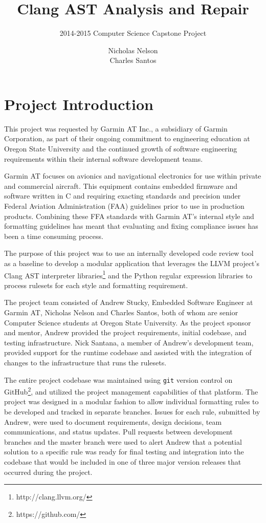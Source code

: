 \documentclass[11pt]{scrreprt}
\title{\textbf{Clang AST Analysis and Repair}}
\subtitle{2014-2015 Computer Science Capstone Project}
\author{Nicholas Nelson\\
		Charles Santos}
\date{}
\begin{document}
\maketitle

\tableofcontents

\chapter{Project Introduction}

This project was requested by Garmin AT Inc., a subsidiary of Garmin Corporation, as part of their ongoing commitment to engineering education at Oregon State University and the continued growth of software engineering requirements within their internal software development teams.

Garmin AT focuses on avionics and navigational electronics for use within private and commercial aircraft.
This equipment contains embedded firmware and software written in C and requiring exacting standards and precision under Federal Aviation Administration (FAA) guidelines prior to use in production products.
Combining these FFA standards with Garmin AT's internal style and formatting guidelines has meant that evaluating and fixing compliance issues has been a time consuming process.

The purpose of this project was to use an internally developed code review tool as a baseline to develop a modular application that leverages the LLVM project's Clang AST interpreter libraries\footnote{http://clang.llvm.org/} and the Python regular expression libraries to process rulesets for each style and formatting requirement.

The project team consisted of Andrew Stucky, Embedded Software Engineer at Garmin AT, Nicholas Nelson and Charles Santos, both of whom are senior Computer Science students at Oregon State University.
As the project sponsor and mentor, Andrew provided the project requirements, initial codebase, and testing infrastructure.
Nick Santana, a member of Andrew's development team, provided support for the runtime codebase and assisted with the integration of changes to the infrastructure that runs the rulesets.

The entire project codebase was maintained using \texttt{git} version control on GitHub\footnote{https://github.com/}, and utilized the project management capabilities of that platform.
The project was designed in a modular fashion to allow individual formatting rules to be developed and tracked in separate branches.
Issues for each rule, submitted by Andrew, were used to document requirements, design decisions, team communications, and status updates.
Pull requests between development branches and the master branch were used to alert Andrew that a potential solution to a specific rule was ready for final testing and integration into the codebase that would be included in one of three major version releases that occurred during the project.
\end{document}
